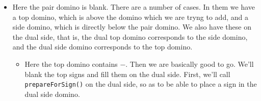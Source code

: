 \documentclass[12pt]{article}
\numberwithin{equation}{section}
\newcommand{\horizontalDominoMaybe}[3]{\filldraw [dominoMaybeStyle] (#2 - 1 + \eps, #1 - 1 + \eps) rectangle + (2 - \teps, 1 -\teps) node [dominoText] {$#3$};}
\newcommand{\verticalDominoMaybeShift}[4]{\filldraw [dominoMaybeStyle] (#2 - 1 + #4 + \eps,  #1 - 1 + \eps) rectangle + (1 - \teps,2 -\teps) node [dominoText] {$#3$};}
\begin{document}
\begin{itemize}
\begin{itemize}
\begin{itemize}
\begin{figure}[H]
        \end{figure}
        \begin{figure}[H]
          \centering
        \end{figure}
        \item Here the pair domino is blank.
        There are a number of cases.
        In them we have a top domino, which is above the domino which we are tryng to add, and a side domino, which is directly below the pair domino.
        We also have these on the dual side, that is, the dual top domino corresponds to the side domino, and the dual side domino corresponds to the top domino.
        \begin{itemize}
          \item Here the top domino contains $-$.
          Then we are basically good to go.
          We'll blank the top signs and fill them on the dual side.
          First, we'll call \texttt{prepareForSign()} on the dual side, so as to be able to place a sign in the dual side domino.
          \begin{figure}[H]
            \centering
\end{figure}
\end{itemize}
\end{itemize}
\end{itemize}
\end{itemize}
\end{document}
